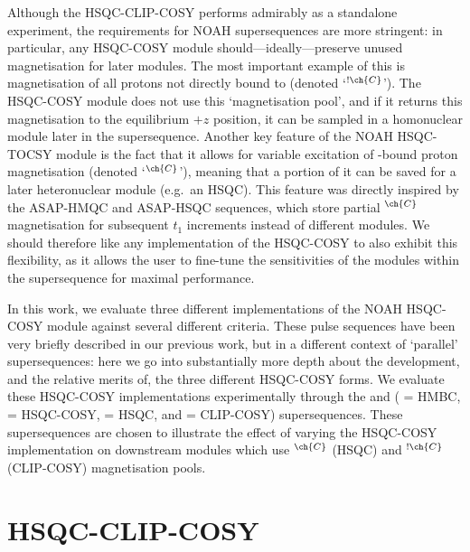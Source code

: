 \documentclass[a4paper,12pt]{article}
\newcommand{\carbon}{\ch{^{13}C}}
\newcommand{\magn}[1]{\ch{^1H}$^{\ch{#1}}$}
\newcommand{\magnnot}[1]{\ch{^1H}$^{!\ch{#1}}$}
\begin{document}
\begin{refsection}
Although the HSQC-CLIP-COSY performs admirably as a standalone experiment, the requirements for NOAH supersequences are more stringent: in particular, any HSQC-COSY module should---ideally---preserve unused magnetisation for later modules.
The most important example of this is magnetisation of all protons not directly bound to \carbon{} (denoted\autocite{Orts2018M,Yong2021JMR} `\magnnot{C}').
The HSQC-COSY module does not use this `magnetisation pool', and if it returns this magnetisation to the equilibrium $+z$ position, it can be sampled in a homonuclear module later in the supersequence.
Another key feature of the NOAH HSQC-TOCSY module is the fact that it allows for variable excitation of \carbon{}-bound proton magnetisation (denoted `\magn{C}'), meaning that a portion of it can be saved for a later heteronuclear module (e.g.\ an HSQC).
This feature was directly inspired by the ASAP-HMQC\autocite{Kupce2007MRC} and ASAP-HSQC\autocite{SchulzeSunninghausen2014JACS,SchulzeSunninghausen2017JMR,Koos2019JMR,Becker2019JMR} sequences, which store partial \magn{C} magnetisation for subsequent $t_1$ increments instead of different modules.
We should therefore like any implementation of the HSQC-COSY to also exhibit this flexibility, as it allows the user to fine-tune the sensitivities of the modules within the supersequence for maximal performance.

In this work, we evaluate three different implementations of the NOAH HSQC-COSY module against several different criteria.
These pulse sequences have been very briefly described in our previous work, but in a different context of `parallel' supersequences\autocite{Kupce2021JACSA}: here we go into substantially more depth about the development, and the relative merits of, the three different HSQC-COSY forms.
We evaluate these HSQC-COSY implementations experimentally through the  and  ( = HMBC,  = HSQC-COSY,  = HSQC, and  = CLIP-COSY) supersequences.
These supersequences are chosen to illustrate the effect of varying the HSQC-COSY implementation on downstream modules which use \magn{C} (HSQC) and \magnnot{C} (CLIP-COSY) magnetisation pools.


\section{HSQC-CLIP-COSY}


\end{refsection}
\end{document}
